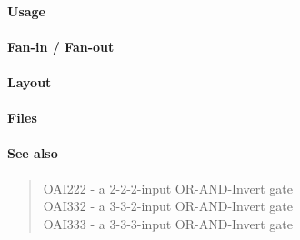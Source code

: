 \paragraph{Usage}

\paragraph{Fan-in / Fan-out}

\paragraph{Layout}

\paragraph{Files}

\paragraph{See also}
\begin{quote}
    OAI222 - a 2-2-2-input OR-AND-Invert gate \\
    OAI332 - a 3-3-2-input OR-AND-Invert gate \\
    OAI333 - a 3-3-3-input OR-AND-Invert gate
\end{quote}
